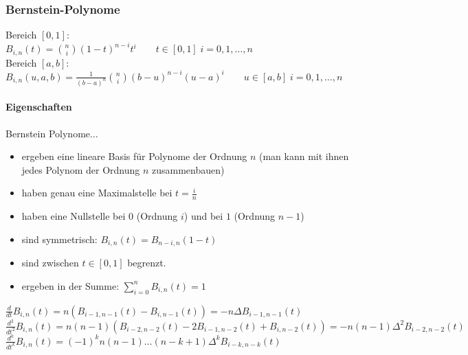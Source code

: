 \begin{minipage}[c]{15.0cm}	
	\subsubsection{Bernstein-Polynome}
	  	Bereich $[0,1]$:\\
	  	
	    $B_{i,n}(t) = \binom{n}{i}(1-t)^{n-i} t^i \qquad t \in [0,1]\; i=0,1,\ldots, n$\\
	    
	    Bereich $[a,b]$:\\
	    
	    $B_{i,n}(u,a,b) =\frac{1}{(b-a)^n}\binom{n}{i}(b-u)^{n-i} (u-a)^i \qquad u \in [a,b]\; i=0,1,\ldots, n$
	\paragraph{Eigenschaften}
		Bernstein Polynome$\ldots$
	    \begin{itemize}
	      \item ergeben eine lineare Basis für Polynome der Ordnung $n$ (man kann mit ihnen jedes Polynom der Ordnung $n$ zusammenbauen)
	      \item haben genau eine Maximalstelle bei $t=\frac in$
	      \item haben eine Nullstelle bei $0$ (Ordnung $i$) und bei $1$ (Ordnung $n-1$)
	      \item sind symmetrisch: $B_{i,n}(t) = B_{n-i,n}(1-t)$
	      \item sind zwischen $t \in [0,1]$ begrenzt.
	      \item ergeben in der Summe: $\sum \limits_{i=0}^n B_{i,n}(t)=1$
	    \end{itemize}
	    
	    $\frac{d}{dt} B_{i,n}(t) = n(B_{i-1,n-1}(t) - B_{i,n-1}(t)) = -n \Delta B_{i-1,n-1}(t)$\\
	    $\frac{d^2}{dt^2} B_{i,n}(t) = n(n-1)(B_{i-2,n-2}(t) -2 B_{i-1,n-2}(t) + B_{i,n-2}(t)) = -n(n-1) \Delta^2 B_{i-2,n-2}(t)$\\
	    $\frac{d^k}{dt^k} B_{i,n}(t) = (-1)^k n(n-1)\ldots(n-k+1) \Delta^k B_{i-k,n-k}(t)$
\end{minipage}
\hfill    
